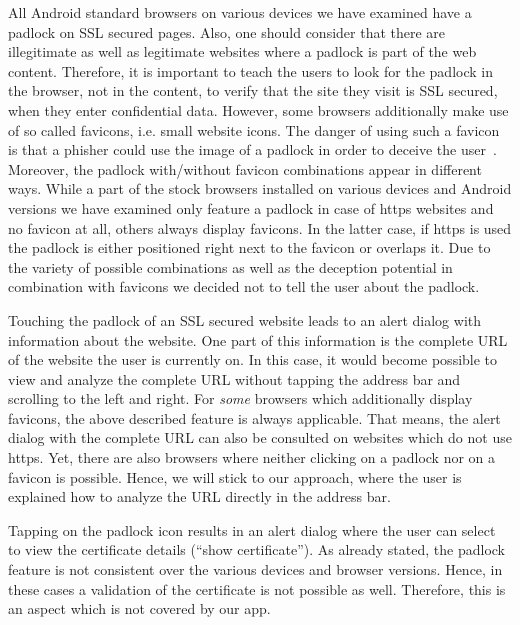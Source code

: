 \begin{description}[leftmargin=0cm]
		\item[Https Padlock] All Android standard browsers on various devices we have examined have a padlock on SSL secured pages.
Also, one should consider that there are illegitimate as well as legitimate websites where a padlock is part of the web content. 
Therefore, it is important to teach the users to look for the padlock in the browser, not in the content, to verify that the site they visit is SSL secured, when they enter confidential data.
However, some browsers additionally make use of so called favicons, i.e. small website icons.
The danger of using such a favicon is that a phisher could use the image of a padlock in order to deceive the user~\cite{trusteer2011}.
Moreover, the padlock with/without favicon combinations appear in different ways. 
While a part of the stock browsers installed on various devices and Android versions we have examined only feature a padlock in case of https websites and no favicon at all, others always display favicons. 
In the latter case, if https is used the padlock is either positioned right next to the favicon or overlaps it.
Due to the variety of possible combinations as well as the deception potential in combination with favicons we decided not to tell the user about the padlock.
		\item[Touch Padlock] Touching the padlock of an SSL secured website leads to an alert dialog with information about the website. 
One part of this information is the complete URL of the website the user is currently on.
In this case, it would become possible to view and analyze the complete URL without tapping the address bar and scrolling to the left and right.
For \textit{some} browsers which additionally display favicons, the above described feature is always applicable.
That means, the alert dialog with the complete URL can also be consulted on websites which do not use https.
Yet, there are also browsers where neither clicking on a padlock nor on a favicon is possible.
Hence, we will stick to our approach, where the user is explained how to analyze the URL directly in the address bar.
		\item[Certificate Verification]Tapping on the padlock icon results in an alert dialog where the user can select to view the certificate details (``show certificate'').
As already stated, the padlock feature is not consistent over the various devices and browser versions.
Hence, in these cases a validation of the certificate is not possible as well.
Therefore, this is an aspect which is not covered by our app.

\end{description}

